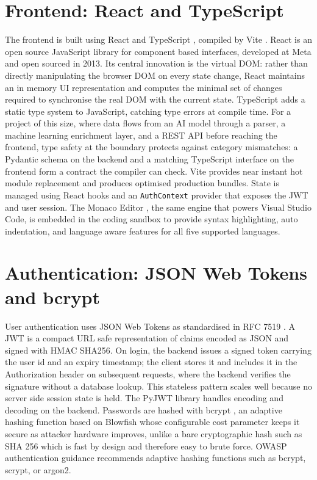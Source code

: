 \section{Frontend: React and TypeScript}

The frontend is built using React \cite{react2013} and TypeScript
\cite{typescript2025}, compiled by Vite \cite{vite2025}. React is an
open source JavaScript library for component based interfaces,
developed at Meta and open sourced in 2013. Its central innovation is
the virtual DOM: rather than directly manipulating the browser DOM on
every state change, React maintains an in memory UI representation
and computes the minimal set of changes required to synchronise the
real DOM with the current state. TypeScript adds a static type system
to JavaScript, catching type errors at compile time. For a project of
this size, where data flows from an AI model through a parser, a
machine learning enrichment layer, and a REST API before reaching the
frontend, type safety at the boundary protects against category
mismatches: a Pydantic schema on the backend and a matching
TypeScript interface on the frontend form a contract the compiler can
check. Vite provides near instant hot module replacement and produces
optimised production bundles. State is managed using
React hooks and an \texttt{AuthContext} provider that exposes the JWT
and user session. The Monaco Editor \cite{monaco2025}, the same engine
that powers Visual Studio Code, is embedded in the coding sandbox to
provide syntax highlighting, auto indentation, and language aware
features for all five supported languages.

\section{Authentication: JSON Web Tokens and bcrypt}

User authentication uses JSON Web Tokens as standardised in RFC 7519
\cite{jwt2015}. A JWT is a compact URL safe representation of claims
encoded as JSON and signed with HMAC SHA256. On login, the backend
issues a signed token carrying the user id and an expiry timestamp;
the client stores it and includes it in the Authorization header on
subsequent requests, where the backend verifies the signature without
a database lookup. This stateless pattern scales well because no
server side session state is held. The PyJWT library handles
encoding and decoding on the backend. Passwords are hashed with
bcrypt \cite{provos1999bcrypt}, an adaptive hashing function based on
Blowfish whose configurable cost parameter keeps it secure as
attacker hardware improves, unlike a bare cryptographic hash such as
SHA 256 which is fast by design and therefore easy to brute force.
OWASP authentication guidance \cite{owasp2021} recommends adaptive
hashing functions such as bcrypt, scrypt, or argon2.

